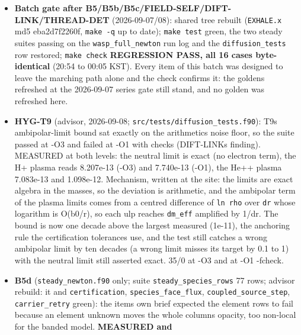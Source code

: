 \documentclass[english,a4paper]{my_memo}
\begin{document}
\begin{itemize}
  B5c measurements. Recorded: \texttt{diffusion\_tests} T9 reads 1.098e-12 against
  its 1e-12 bound at \texttt{-O1\ -fcheck} (an optimization-level rounding
  sensitivity of \texttt{relative\_settling\_mass}, 35/0 at -O3); the outer loop\textquotesingle s
  under-relaxation damps helium only while the drift it tests can now be set
  by a trace element.
\item
  \textbf{Batch gate after B5/B5b/B5c/FIELD-SELF/DIFT-LINK/THREAD-DET}
  (2026-09-07/08): shared tree rebuilt (\texttt{EXHALE.x} md5 eba2d7f2260f,
  \texttt{make\ -q} up to date); \texttt{make\ test} green, the two steady suites passing on
  the \texttt{wasp\_full\_newton} run log and the \texttt{diffusion\_tests} row restored;
  \texttt{make\ check} \textbf{REGRESSION PASS, all 16 cases byte-identical} (20:54 to
  00:05 KST). Every item of this batch was designed to leave the marching
  path alone and the check confirms it: the goldens refreshed at the
  2026-09-07 series gate still stand, and no golden was refreshed here.
\item
  \textbf{HYG-T9} (advisor, 2026-09-08; \texttt{src/tests/diffusion\_tests.f90}): T9\textquotesingle s
  ambipolar-limit bound sat exactly on the arithmetic\textquotesingle s noise floor, so the
  suite passed at -O3 and failed at -O1 with checks (DIFT-LINK\textquotesingle s finding).
  MEASURED at both levels: the neutral limit is exact (no electron term),
  the H+ plasma reads 8.207e-13 (-O3) and 7.740e-13 (-O1), the He++ plasma
  7.083e-13 and 1.098e-12. Mechanism, written at the site: the limits are
  exact algebra in the masses, so the deviation is arithmetic, and the
  ambipolar term of the plasma limits comes from a centred difference of
  \texttt{ln\ rho} over \texttt{dr} whose logarithm is O(b0/r), so each ulp reaches
  \texttt{dm\_eff} amplified by 1/dr. The bound is now one decade above the largest
  measured (1e-11), the anchoring rule the certification tolerances use, and
  the test still catches a wrong ambipolar limit by ten decades (a wrong
  limit misses its target by 0.1 to 1) with the neutral limit still asserted
  exact. 35/0 at -O3 and at -O1 -fcheck.
\item
  \textbf{B5d} (\texttt{steady\_newton.f90} only; suite \texttt{steady\_species\_rows} 77 rows;
  advisor rebuild: it and \texttt{certification}, \texttt{species\_face\_flux},
  \texttt{coupled\_source\_step}, \texttt{carrier\_retry} green): the item\textquotesingle s own brief
  expected the element rows to fail because an element unknown moves the
  whole column\textquotesingle s opacity, too non-local for the banded model. \textbf{MEASURED and
}
\end{itemize}
\end{document}
